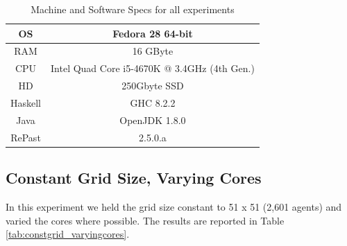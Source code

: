 \begin{table}
	\centering
	\begin{tabular}{ c || c }
		OS & Fedora 28 64-bit \\ \hline
		RAM & 16 GByte \\ \hline
		CPU & Intel Quad Core i5-4670K @ 3.4GHz (4th Gen.) \\ \hline
		HD & 250Gbyte SSD \\ \hline
		Haskell & GHC 8.2.2 \\ \hline
		Java & OpenJDK 1.8.0 \\ \hline
		RePast & 2.5.0.a
	\end{tabular}
	
	\caption{Machine and Software Specs for all experiments}
	\label{tab:machine_specs}
\end{table}

\subsection{Constant Grid Size, Varying Cores}
In this experiment we held the grid size constant to 51 x 51 (2,601 agents) and varied the cores where possible. The results are reported in Table \ref{tab:constgrid_varyingcores}.

